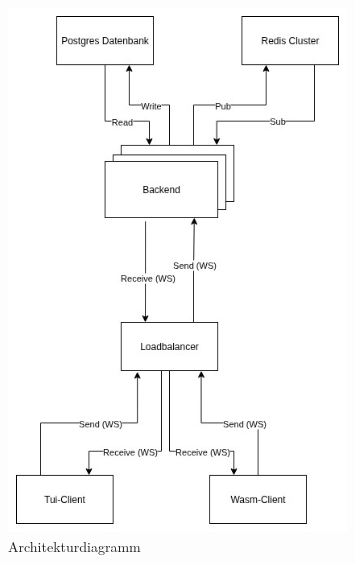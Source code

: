 \begin{figure}[H]
    \centering
    \includegraphics[width=0.8\textwidth]{images/architecture.png}
    \caption{Architekturdiagramm}
    \label{fig:architecture}
\end{figure}

